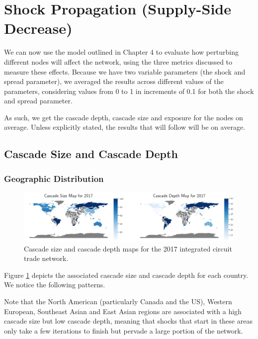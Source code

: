 \documentclass[12pt,letterpaper]{report}
\begin{document}
	\section{Shock Propagation (Supply-Side Decrease)}
	\label{sec:53supplysideDecrease}
	
	We can now use the model outlined in Chapter 4 to evaluate how perturbing different nodes will affect the network, using the three metrics discussed to measure these effects. Because we have two variable parameters (the shock and spread parameter), we averaged the results across different values of the parameters, considering values from 0 to 1 in increments of 0.1 for both the shock and spread parameter. 
	
	As such, we get the cascade depth, cascade size and exposure for the nodes on average. Unless explicitly stated, the results that will follow will be on average.
	
		\subsection{Cascade Size and Cascade Depth}
		\label{ssec:531cascadeSizeDepth}
		
			\subsubsection{Geographic Distribution}
			\label{ssec:5311geographic}
			
				\begin{figure}[!h]
					\centering
					\includegraphics[width=\textwidth]{Fig513-CascadeMap.png}
					\caption{Cascade size and cascade depth maps for the 2017 integrated circuit trade network.}\label{fig:513CascadeMap}
				\end{figure}
				
				Figure \ref{fig:513CascadeMap} depicts the associated cascade size and cascade depth for each country. We notice the following patterns.
				
				Note that the North American (particularly Canada and the US), Western European, Southeast Asian and East Asian regions are associated with a high cascade size but low cascade depth, meaning that shocks that start in these areas only take a few iterations to finish but pervade a large portion of the network.
				
\end{document}
